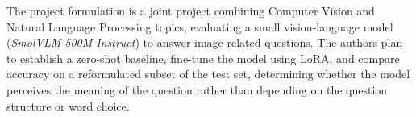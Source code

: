 The project formulation is a joint project combining Computer Vision and 
Natural Language Processing topics, evaluating a small vision-language model 
(\textit{SmolVLM-500M-Instruct}) to answer image-related questions. The authors plan to 
establish a zero-shot baseline, fine-tune the model using LoRA, and compare accuracy on
a reformulated subset of the test set, determining whether the model perceives
the meaning of the question rather than depending on the question structure or word choice. 